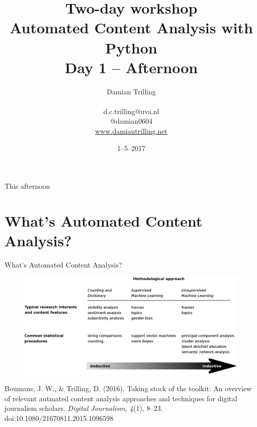 \documentclass{beamer}
\begin{document}
\title[Automated Content Analysis with Python]{\textbf{Two-day workshop\\ Automated Content Analysis with Python} \\ Day 1 -- Afternoon}
\author[Damian Trilling]{Damian Trilling \\ ~ \\ \footnotesize{d.c.trilling@uva.nl \\@damian0604} \\ \url{www.damiantrilling.net}}
\date{1--5--2017}



\begin{frame}{}
\titlepage
\end{frame}

\begin{frame}{This afternoon}
\tableofcontents
\end{frame}



\section[What's ACA?]{What's Automated Content Analysis?}
\begin{frame}[plain]
	What's Automated Content Analysis?
\end{frame}


\begin{frame}[plain]
\begin{figure}
\centering
\includegraphics[width=1.0\linewidth]{boumanstrilling2016}
\label{fig:boumanstrilling2016}
\end{figure}
\tiny{Boumans, J. W., \& Trilling, D. (2016). Taking stock of the toolkit: An overview of relevant autmated content analysis approaches and techniques for digital journalism scholars. \emph{Digital Journalism, 4}(1), 8–23. doi:10.1080/21670811.2015.1096598}
\end{frame}
\end{document}
